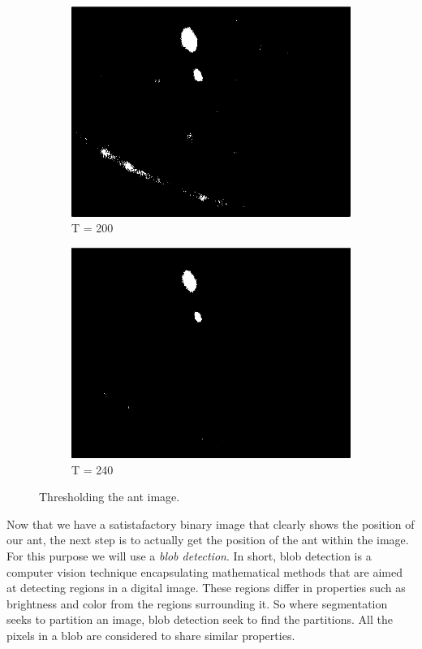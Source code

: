 \begin{figure}
\begin{subfigure}[b]{0.4\textwidth}
                \includegraphics[scale = 0.2]{img/thresh200}
                \caption{T = 200}
        \end{subfigure}
		\quad
        \begin{subfigure}[b]{0.4\textwidth}
                \includegraphics[scale = 0.2]{img/thresh240}
                \caption{T = 240}
        \end{subfigure}
		\caption{Thresholding the ant image.}
		\label{fig:threshant}
\end{figure}

Now that we have a satistafactory binary image that clearly shows the position of our ant, the next step is to actually get the position of the ant within the image. For this purpose we will use a \textit{blob detection}. In short, blob detection is a computer vision technique encapsulating mathematical methods that are aimed at detecting regions in a digital image. These regions differ in properties such as brightness and color from the regions surrounding it. So where segmentation seeks to partition an image, blob detection seek to find the partitions. All the pixels in a blob are considered to share similar properties.

